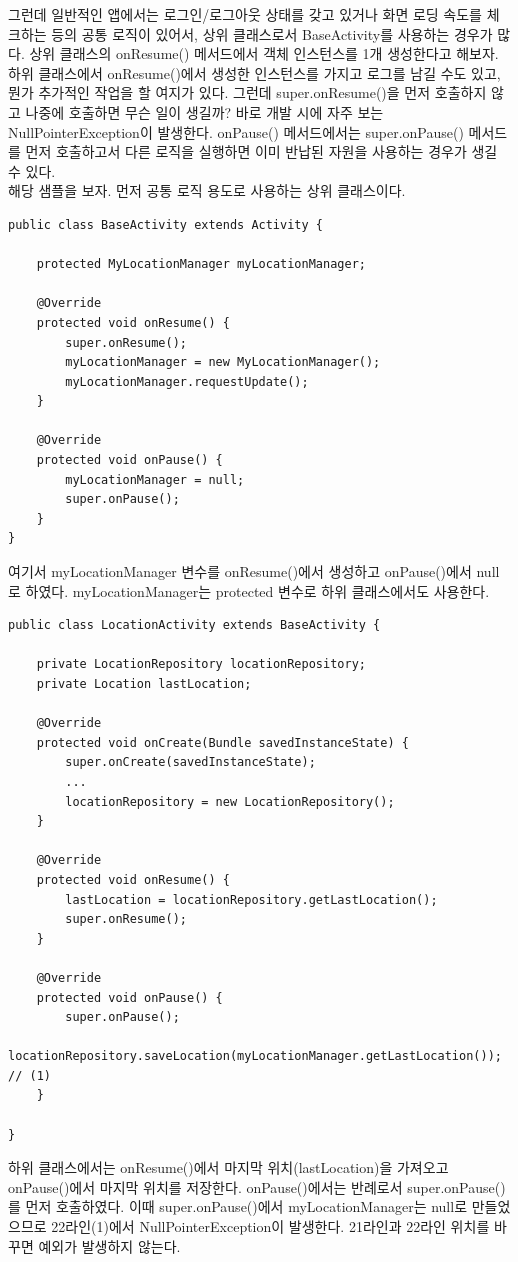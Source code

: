 그런데 일반적인 앱에서는 로그인/로그아웃 상태를 갖고 있거나 화면 로딩 속도를 체크하는 등의 공통 로직이 있어서, 상위 클래스로서 BaseActivity를 사용하는 경우가 많다.
상위 클래스의 onResume() 메서드에서 객체 인스턴스를 1개 생성한다고 해보자. 
하위 클래스에서 onResume()에서 생성한 인스턴스를 가지고 로그를 남길 수도 있고, 뭔가 추가적인 작업을 할 여지가 있다. 
그런데 super.onResume()을 먼저 호출하지 않고 나중에 호출하면 무슨 일이 생길까? 바로 개발 시에 자주 보는 NullPointerException이 발생한다.
onPause() 메서드에서는 super.onPause() 메서드를 먼저 호출하고서 다른 로직을 실행하면
이미 반납된 자원을 사용하는 경우가 생길 수 있다.\\

해당 샘플을 보자. 먼저 공통 로직 용도로 사용하는 상위 클래스이다.
\begin{lstlisting}[frame=single]
public class BaseActivity extends Activity {

	protected MyLocationManager myLocationManager;

	@Override
	protected void onResume() {
		super.onResume();
		myLocationManager = new MyLocationManager();
		myLocationManager.requestUpdate();
	}

	@Override
	protected void onPause() {
		myLocationManager = null;
		super.onPause();
	}
}
\end{lstlisting}
여기서 myLocationManager 변수를 onResume()에서 생성하고 onPause()에서 null로 하였다. 
myLocationManager는 protected 변수로 하위 클래스에서도 사용한다.

\begin{lstlisting}[frame=single]
public class LocationActivity extends BaseActivity {

	private LocationRepository locationRepository;
	private Location lastLocation;

	@Override
	protected void onCreate(Bundle savedInstanceState) {
		super.onCreate(savedInstanceState);
		...
		locationRepository = new LocationRepository();
	}

	@Override
	protected void onResume() {
		lastLocation = locationRepository.getLastLocation();
		super.onResume();
	}

	@Override
	protected void onPause() {
		super.onPause();
		locationRepository.saveLocation(myLocationManager.getLastLocation()); // (1)
	}

}
\end{lstlisting}
하위 클래스에서는 onResume()에서 마지막 위치(lastLocation)을 가져오고 onPause()에서 마지막 위치를 저장한다. 
onPause()에서는 반례로서 super.onPause()를 먼저 호출하였다. 
이때 super.onPause()에서 myLocationManager는 null로 만들었으므로 22라인(1)에서 NullPointerException이 발생한다. 
21라인과 22라인 위치를 바꾸면 예외가 발생하지 않는다. 

